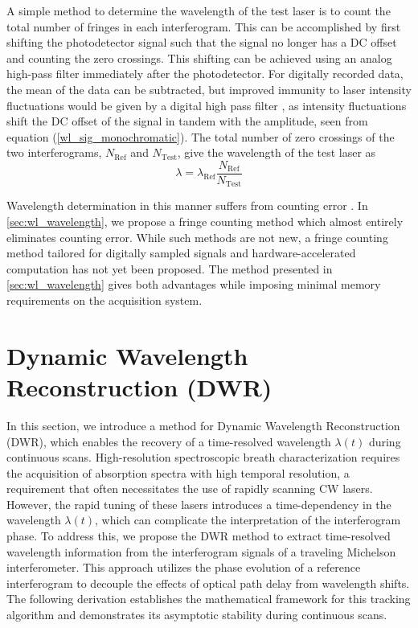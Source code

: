 \documentclass[8pt,a4paper]{report}
\begin{document}
	A simple method to determine the wavelength of the test laser is to count the total number of fringes in each interferogram. This can be accomplished by first shifting the photodetector signal such that the signal no longer has a DC offset and counting the zero crossings. This shifting can be achieved using an analog high-pass filter \cite{Su_analogFilters} immediately after the photodetector. For digitally recorded data, the mean of the data can be subtracted, but improved immunity to laser intensity fluctuations would be given by a digital high pass filter \cite{digital_filter_handbook}, as intensity fluctuations shift the DC offset of the signal in tandem with the amplitude, seen from equation (\ref{wl_sig_monochromatic}). The total number of zero crossings of the two interferograms, $N_\mathrm{Ref}$ and $N_\mathrm{Test}$, give the wavelength of the test laser as
	\begin{equation} \label{wl_wavelength_simple}
		\lambda = \lambda_\mathrm{Ref} \frac{N_\mathrm{Ref}}{N_\mathrm{Test}}
	\end{equation}
	
	Wavelength determination in this manner suffers from counting error \cite{Demtroder2008}. In \ref{sec:wl_wavelength}, we propose a fringe counting method which almost entirely eliminates counting error. While such methods are not new, a fringe counting method tailored for digitally sampled signals and hardware-accelerated computation has not yet been proposed. The method presented in \ref{sec:wl_wavelength} gives both advantages while imposing minimal memory requirements on the acquisition system.
	
	\section{Dynamic Wavelength Reconstruction (DWR)} \label{sec:wl_tracking}
	
	In this section, we introduce a method for Dynamic Wavelength Reconstruction (DWR), which enables the recovery of a time-resolved wavelength $\lambda(t)$ during continuous scans. High-resolution spectroscopic breath characterization requires the acquisition of absorption spectra with high temporal resolution, a requirement that often necessitates the use of rapidly scanning CW lasers. However, the rapid tuning of these lasers introduces a time-dependency in the wavelength $\lambda(t)$, which can complicate the interpretation of the interferogram phase. To address this, we propose the DWR method to extract time-resolved wavelength information from the interferogram signals of a traveling Michelson interferometer. This approach utilizes the phase evolution of a reference interferogram to decouple the effects of optical path delay from wavelength shifts. The following derivation establishes the mathematical framework for this tracking algorithm and demonstrates its asymptotic stability during continuous scans.
	
\end{document}
